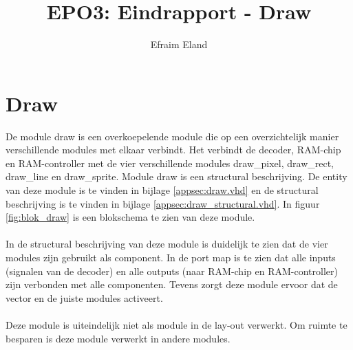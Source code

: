 \documentclass{scrartcl} %
\author{Efraim Eland}
\title{EPO3: Eindrapport - Draw}
\begin{document}
\chapter{Draw}
\label{ch:draw}

De module draw is een overkoepelende module die op een overzichtelijk manier verschillende modules met elkaar verbindt. Het verbindt de decoder, RAM-chip en RAM-controller met de vier verschillende modules draw\_pixel, draw\_rect, draw\_line en draw\_sprite. Module draw is een structural beschrijving. De entity van deze module is te vinden in bijlage \ref{appsec:draw.vhd} en de structural beschrijving is te vinden in bijlage \ref{appsec:draw_structural.vhd}. In figuur \ref{fig:blok_draw} is een blokschema te zien van deze module.
\\\\
In de structural beschrijving van deze module is duidelijk te zien dat de vier modules zijn gebruikt als component. In de port map is te zien dat alle inputs (signalen van de decoder) en alle outputs (naar RAM-chip en RAM-controller) zijn verbonden met alle componenten. Tevens zorgt deze module ervoor dat de vector en de juiste modules activeert.
\\\\
Deze module is uiteindelijk niet als module in de lay-out verwerkt. Om ruimte te besparen is deze module verwerkt in andere modules.
\end{document}
